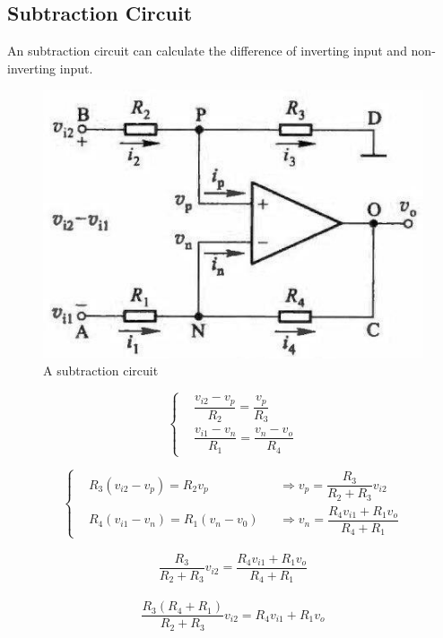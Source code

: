 \subsection{Subtraction Circuit}

An subtraction circuit can calculate the difference of inverting input and non-inverting input.

\begin{figure}[H]
  \centering
  \includegraphics[width=0.4\linewidth]{figures/subtraction-amplifier}
  \caption{A subtraction circuit}
  \label{fig:}
\end{figure}

\begin{equation*}
  \left\{
    \begin{aligned}
      & \dfrac{v_{i2} - v_p}{R_2} = \dfrac{v_p}{R_3} \\
      & \dfrac{v_{i1} - v_n}{R_1} = \dfrac{v_n - v_o}{R_4}  
    \end{aligned}
  \right.
\end{equation*}

\begin{equation*}
  \left\{
  \begin{aligned}
    & R_3 \left( v_{i2} - v_p \right) = R_2 v_p && \Rightarrow v_p = \dfrac{R_3}{R_2 + R_3} v_{i2} \\
    & R_4 \left( v_{i1} - v_n \right) = R_1 \left( v_n - v_0 \right) && \Rightarrow v_n = \dfrac{R_4 v_{i1} + R_1 v_o}{R_4 + R_1}
  \end{aligned}
  \right.
\end{equation*}

\begin{equation*}
  \begin{aligned}
    \dfrac{R_3}{R_2 + R_3} v_{i2} = \dfrac{R_4 v_{i1} + R_1 v_o}{R_4 + R_1}
  \end{aligned}
\end{equation*}

\begin{equation*}
  \begin{aligned}
    \dfrac{R_3 \left( R_4 + R_1 \right)}{R_2 + R_3} v_{i2} = R_4 v_{i1} + R_1 v_o
  \end{aligned}
\end{equation*}


